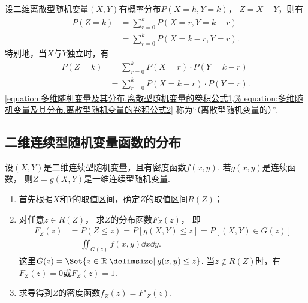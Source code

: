 \begin{theorem}\label{theorem:多维随机变量及其分布.离散型随机变量的卷积公式}
设二维离散型随机变量\((X,Y)\)有概率分布\(P(X=h,Y=k)\)，
\(Z=X+Y\)，则有\begin{align}
	P(Z=k)
	&= \sum_{r=0}^k P(X=r,Y=k-r) \\
	&= \sum_{r=0}^k P(X=k-r,Y=r).
\end{align}
特别地，当\(X\)与\(Y\)独立时，有\begin{align}
	P(Z=k)
	&= \sum_{r=0}^k P(X=r) \cdot P(Y=k-r) \label{equation:多维随机变量及其分布.离散型随机变量的卷积公式1} \\
	&= \sum_{r=0}^k P(X=k-r) \cdot P(Y=r). \label{equation:多维随机变量及其分布.离散型随机变量的卷积公式2}
\end{align}
\rm\cref{equation:多维随机变量及其分布.离散型随机变量的卷积公式1,%
equation:多维随机变量及其分布.离散型随机变量的卷积公式2}
称为“（离散型随机变量的）”.
\end{theorem}

\subsection{二维连续型随机变量函数的分布}
设\((X,Y)\)是二维连续型随机变量，且有密度函数\(f(x,y)\).
若\(g(x,y)\)是连续函数，
则\(Z = g(X,Y)\)是一维连续型随机变量.
\begin{enumerate}
	\item 首先根据\(X\)和\(Y\)的取值区间，确定\(Z\)的取值区间\(R(Z)\)；

	\item 对任意\(z \in R(Z)\)，
	求\(Z\)的分布函数\(F_Z(z)\)，
	即\begin{align*}
		F_Z(z) &= P(Z \leq z)
		= P[g(X,Y) \leq z]
		= P[(X,Y) \in G(z)] \\
		&= \iint_{G(z)} f(x,y) \dd{x}\dd{y}.
	\end{align*}
	这里\(G(z) = \Set{ z\in\mathbb{R} \given g(x,y) \leq z }\).
	当\(z \notin R(Z)\)时，有\(F_Z(z)=0\)或\(F_Z(z)=1\).

	\item 求导得到\(Z\)的密度函数\(f_Z(z) = F'_Z(z)\).
\end{enumerate}

